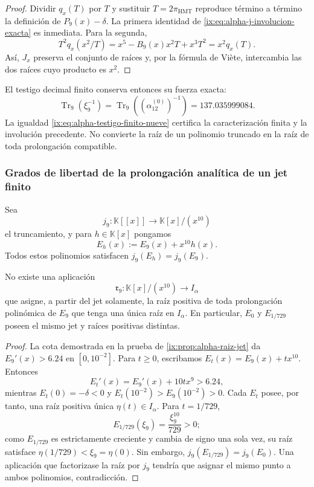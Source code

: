 \begin{proof}
Dividir \(q_x(T)\) por \(T\) y sustituir
\(T=2\pi_{\mathrm{HMT}}\) reproduce término a término la definición de
\(P_9(x)-\delta\). La primera identidad de
\eqref{ix:eq:alpha-j-involucion-exacta} es inmediata. Para la segunda,
\[
 T^2q_x(x^2/T)
 =x^5-B_9(x)x^2T+x^3T^2=x^2q_x(T).
\]
Así, \(J_x\) preserva el conjunto de raíces y, por la fórmula de Viète,
intercambia las dos raíces cuyo producto es \(x^2\).
\end{proof}

El testigo decimal finito conserva entonces su fuerza exacta:
\begin{equation}
 \operatorname{Tr}_9(\xi_9^{-1})
 =\operatorname{Tr}_9\!\left((\alpha_{12}^{(0)})^{-1}\right)
 =137.035999084.
 \label{ix:eq:alpha-testigo-finito-nueve}
\end{equation}
La igualdad \eqref{ix:eq:alpha-testigo-finito-nueve} certifica la
caracterización finita y la involución precedente. No convierte la raíz de
un polinomio truncado en la raíz de toda prolongación compatible.

\subsubsection{Grados de libertad de la prolongación analítica de un jet finito}

Sea
\[
 j_9:\mathbb K[[x]]\longrightarrow \mathbb K[x]/(x^{10})
\]
el truncamiento, y para \(h\in\mathbb K[x]\) pongamos
\begin{equation}
 E_h(x):=E_9(x)+x^{10}h(x).
 \label{ix:eq:alpha-familia-prolongaciones-mismo-jet}
\end{equation}
Todos estos polinomios satisfacen \(j_9(E_h)=j_9(E_9)\).

\begin{theorem}
\label{ix:thm:alpha-no-unicidad-prolongacion-jet}
No existe una aplicación
\[
 \mathfrak r_9:\mathbb K[x]/(x^{10})\longrightarrow I_\alpha
\]
que asigne, a partir del jet solamente, la raíz positiva de toda
prolongación polinómica de \(E_9\) que tenga una única raíz en
\(I_\alpha\). En particular, \(E_0\) y \(E_{1/729}\) poseen el mismo jet y
raíces positivas distintas.
\end{theorem}

\begin{proof}
La cota demostrada en la prueba de
\ref{ix:prop:alpha-raiz-jet} da \(E_9'(x)>6.24\) en
\([0,10^{-2}]\). Para \(t\geq0\), escribamos
\(E_t(x)=E_9(x)+tx^{10}\). Entonces
\[
 E_t'(x)=E_9'(x)+10tx^9>6.24,
\]
mientras \(E_t(0)=-\delta<0\) y
\(E_t(10^{-2})>E_9(10^{-2})>0\). Cada \(E_t\) posee, por tanto, una raíz
positiva única \(\eta(t)\in I_\alpha\). Para \(t=1/729\),
\[
 E_{1/729}(\xi_9)=\frac{\xi_9^{10}}{729}>0;
\]
como \(E_{1/729}\) es estrictamente creciente y cambia de signo una sola
vez, su raíz satisface \(\eta(1/729)<\xi_9=\eta(0)\). Sin embargo,
\(j_9(E_{1/729})=j_9(E_0)\). Una aplicación que factorizase la raíz por
\(j_9\) tendría que asignar el mismo punto a ambos polinomios, contradicción.
\end{proof}

